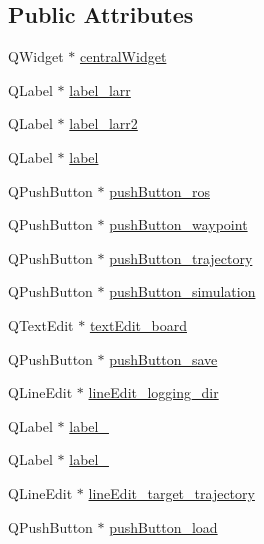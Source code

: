 \subsection*{Public Attributes}
\begin{DoxyCompactItemize}
\item 
Q\+Widget $\ast$ \hyperlink{class_ui___main_window_a30075506c2116c3ed4ff25e07ae75f81}{central\+Widget}
\item 
Q\+Label $\ast$ \hyperlink{class_ui___main_window_a32587f1e879f5b685d375d2daa20f7a6}{label\+\_\+larr}
\item 
Q\+Label $\ast$ \hyperlink{class_ui___main_window_a06fc1a01ac3ba3d4d1f75a0e8ab06684}{label\+\_\+larr2}
\item 
Q\+Label $\ast$ \hyperlink{class_ui___main_window_ad9c89133780f28e6efa2ec17ceb9cff5}{label}
\item 
Q\+Push\+Button $\ast$ \hyperlink{class_ui___main_window_a2667c2b4f9c61bf9895b73d07d4b5172}{push\+Button\+\_\+ros}
\item 
Q\+Push\+Button $\ast$ \hyperlink{class_ui___main_window_a6b5d7c0f96cdb3276a33746fbcd7e8c7}{push\+Button\+\_\+waypoint}
\item 
Q\+Push\+Button $\ast$ \hyperlink{class_ui___main_window_a9d644554288462450d209192c1998095}{push\+Button\+\_\+trajectory}
\item 
Q\+Push\+Button $\ast$ \hyperlink{class_ui___main_window_afd109ead0ad1ae7ae67ad1df803c9c38}{push\+Button\+\_\+simulation}
\item 
Q\+Text\+Edit $\ast$ \hyperlink{class_ui___main_window_af13441b9fd874f1aeb2ec5cefaeb0bce}{text\+Edit\+\_\+board}
\item 
Q\+Push\+Button $\ast$ \hyperlink{class_ui___main_window_a257d4df0fe652a526e4fddba93c7a7d8}{push\+Button\+\_\+save}
\item 
Q\+Line\+Edit $\ast$ \hyperlink{class_ui___main_window_a7ab71242b81ef9d13f83c16f6328f35d}{line\+Edit\+\_\+logging\+\_\+dir}
\item 
Q\+Label $\ast$ \hyperlink{class_ui___main_window_a2e2516d755e4dd53fc905dabddf2738a}{label\+\_}
\item 
Q\+Label $\ast$ \hyperlink{class_ui___main_window_a0376fd90247280e7c7957cc70628708c}{label\+\_}
\item 
Q\+Line\+Edit $\ast$ \hyperlink{class_ui___main_window_a4a75bfb754049f89fccef822cad712d6}{line\+Edit\+\_\+target\+\_\+trajectory}
\item 
Q\+Push\+Button $\ast$ \hyperlink{class_ui___main_window_a67832089879377ce16b3f26fbb2cc3f2}{push\+Button\+\_\+load}

\end{DoxyCompactItemize}
